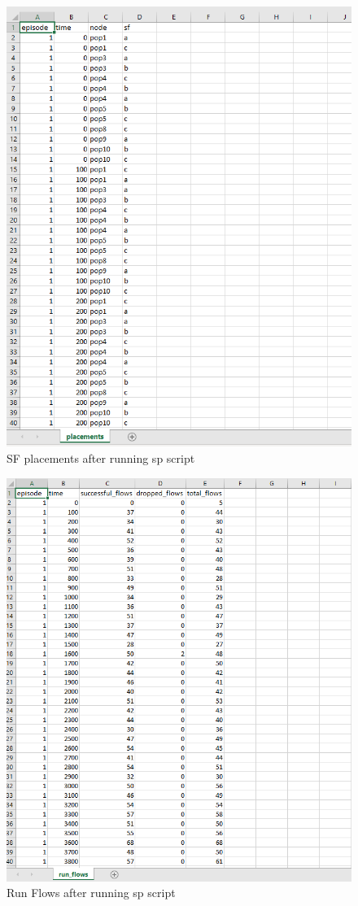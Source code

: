 \begin{figure}[h]
    \centering
    \includegraphics[width=1\textwidth]{spplacements}
    \caption{SF placements after running sp script}
    \label{fig:splacements}
\end{figure}


\begin{figure}[h]
    \centering
    \includegraphics[width=1\textwidth]{sprunflows}
    \caption{Run Flows after running sp script}
    \label{fig:sprunflows}
\end{figure}